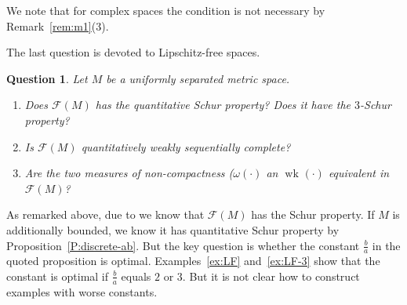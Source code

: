 \documentclass{amsart}
\numberwithin{equation}{section}
\newtheorem{ques}[thm]{Question}
\theoremstyle{definition}
\def\F{\mathcal F}
\newcommand{\wk}[2][]{\operatorname{wk}_{#1}\left(#2\right)}
\begin{document}
We note that for complex spaces the condition is not necessary by Remark~\ref{rem:m1}(3).

The last question is devoted to Lipschitz-free spaces.

\begin{ques}
    Let $M$ be a uniformly separated metric space.
    \begin{enumerate}[$(1)$]
        \item Does $\F(M)$ has the quantitative Schur property? Does it have the $3$-Schur property?
        \item Is $\F(M)$ quantitatively weakly sequentially complete?
        \item Are the two measures of non-compactness ($\omega(\cdot)$ an $\wk{\cdot}$ equivalent in $\F(M)$?
     \end{enumerate}
\end{ques}

As remarked above, due to \cite{p1u} we know that $\F(M)$ has the Schur property. If $M$ is additionally bounded, we know it has quantitative Schur property by Proposition~\ref{P:discrete-ab}. But the key question is whether the constant $\frac ba$ in the quoted proposition is optimal. Examples~\ref{ex:LF} and~\ref{ex:LF-3} show that the constant is optimal if $\frac ba$ equals $2$ or $3$. But it is not clear how to construct examples with worse constants.




   


\end{document}
